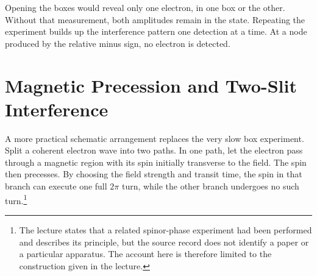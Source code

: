 \begin{classroomqa}
\end{classroomqa}

Opening the boxes would reveal only one electron, in one box or the other. Without that measurement, both amplitudes remain in the state. Repeating the experiment builds up the interference pattern one detection at a time. At a node produced by the relative minus sign, no electron is detected.

\section{Magnetic Precession and Two-Slit Interference}

A more practical schematic arrangement replaces the very slow box experiment. Split a coherent electron wave into two paths. In one path, let the electron pass through a magnetic region with its spin initially transverse to the field. The spin then precesses. By choosing the field strength and transit time, the spin in that branch can execute one full \(2\pi\) turn, while the other branch undergoes no such turn.\footnote{The lecture states that a related spinor-phase experiment had been performed and describes its principle, but the source record does not identify a paper or a particular apparatus. The account here is therefore limited to the construction given in the lecture.}

\begin{classroomqa}
\end{classroomqa}

\begin{classroomqa}
\end{classroomqa}


